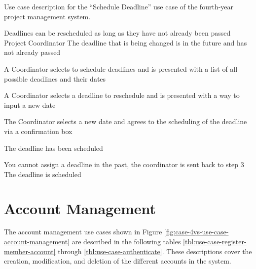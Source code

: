 \documentclass[document.tex]{subfiles}
\begin{document}
\begin{table}[!htbp]
  \centering
  \caption{Use case description for the ``Schedule Deadline'' use case of the fourth-year project management system.}
  \label{tbl:use-case-reschedule-deadline}

  \begin{usecase}
    Deadlines can be rescheduled as long as they have not already been passed
    Project Coordinator
    The deadline that is being changed is in the future and has not already passed
    \ucnormal
    \begin{ucenum}
      \item A Coordinator selects to schedule deadlines and is presented with a list of all possible deadlines and their dates
      \item A Coordinator selects a deadline to reschedule and is presented with a way to input a new date
      \item The Coordinator selects a new date and agrees to the scheduling of the deadline via a confirmation box
      \item The deadline has been scheduled
    \end{ucenum}
    You cannot assign a deadline in the past, the coordinator is sent back to step 3
    The deadline is scheduled
  \end{usecase}
\end{table}


\FloatBarrier



\section{Account Management}
\label{sec:account-management}

The account management use cases shown in Figure \ref{fig:case-4ys-use-case-account-management} are described in the following tables \ref{tbl:use-case-register-member-account} through \ref{tbl:use-case-authenticate}. These descriptions cover the creation, modification, and deletion of the different accounts in the system.
\end{document}
